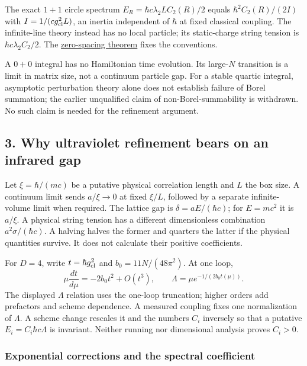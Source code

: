\documentclass[11pt,a4paper]{article}
\begin{document}
The exact \(1+1\) circle spectrum \(E_R=\hbar c\lambda_2LC_2(R)/2\)
equals \(\hbar^2C_2(R)/(2I)\) with \(I=1/(cg_{\rm cl}^2L)\), an inertia
independent of \(\hbar\) at fixed classical coupling. The infinite-line
theory instead has no local particle; its static-charge string tension
is \(\hbar c\lambda_2C_2/2\). The
\href{zero-spacing-any-action.md}{zero-spacing theorem} fixes the
conventions.

A \(0+0\) integral has no Hamiltonian time evolution. Its large-\(N\)
transition is a limit in matrix size, not a continuum particle gap. For
a stable quartic integral, asymptotic perturbation theory alone does not
establish failure of Borel summation; the earlier unqualified claim of
non-Borel-summability is withdrawn. No such claim is needed for the
refinement argument.

\hypertarget{why-ultraviolet-refinement-bears-on-an-infrared-gap}{%
\subsection{3. Why ultraviolet refinement bears on an infrared
gap}\label{why-ultraviolet-refinement-bears-on-an-infrared-gap}}

Let \(\xi=\hbar/(mc)\) be a putative physical correlation length and
\(L\) the box size. A continuum limit sends \(a/\xi\to0\) at fixed
\(\xi/L\), followed by a separate infinite-volume limit when required.
The lattice gap is \(\delta=aE/(\hbar c)\); for \(E=mc^2\) it is
\(a/\xi\). A physical string tension has a different dimensionless
combination \(a^2\sigma/(\hbar c)\). A halving halves the former and
quarters the latter if the physical quantities survive. It does not
calculate their positive coefficients.

For \(D=4\), write \(t=\hbar g_{\rm cl}^2\) and \(b_0=11N/(48\pi^2)\).
At one loop, \[
 \mu\frac{dt}{d\mu}=-2b_0t^2+O(t^3),\qquad
 \Lambda=\mu e^{-1/(2b_0t(\mu))}.
\] The displayed \(\Lambda\) relation uses the one-loop truncation;
higher orders add prefactors and scheme dependence. A measured coupling
fixes one normalization of \(\Lambda\). A scheme change rescales it and
the numbers \(C_i\) inversely so that a putative
\(E_i=C_i\hbar c\Lambda\) is invariant. Neither running nor dimensional
analysis proves \(C_i>0\).

\hypertarget{exponential-corrections-and-the-spectral-coefficient}{%
\subsubsection{Exponential corrections and the spectral
coefficient}\label{exponential-corrections-and-the-spectral-coefficient}}
\end{document}

